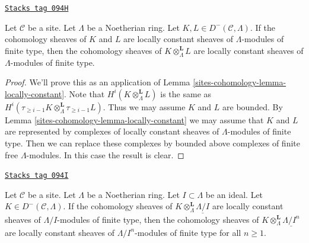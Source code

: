 \begin{lemma}
\label{sites-cohomology-lemma-locally-constant-tensor-product}
\href{https://stacks.math.columbia.edu/tag/094H}{\texttt{Stacks tag 094H}}

Let $\mathcal{C}$ be a site. Let $\Lambda$ be a Noetherian ring.
Let $K, L \in D^-(\mathcal{C}, \Lambda)$. If the cohomology sheaves of
$K$ and $L$ are locally constant sheaves of $\Lambda$-modules of
finite type, then the cohomology sheaves of
$K \otimes_\Lambda^\mathbf{L} L$
are locally constant sheaves of $\Lambda$-modules of finite type.
\end{lemma}

\begin{proof}
We'll prove this as an application of Lemma \ref{sites-cohomology-lemma-locally-constant}.
Note that $H^i(K \otimes_\Lambda^\mathbf{L} L)$ is the same as
$H^i(\tau_{\geq i - 1}K \otimes_\Lambda^\mathbf{L} \tau_{\geq i - 1}L)$.
Thus we may assume $K$ and $L$ are bounded. By
Lemma \ref{sites-cohomology-lemma-locally-constant}
we may assume that $K$ and $L$ are represented by
complexes of locally constant sheaves of $\Lambda$-modules
of finite type. Then we can replace these complexes by
bounded above complexes of finite free $\Lambda$-modules.
In this case the result is clear.
\end{proof}

\begin{lemma}
\label{sites-cohomology-lemma-locally-constant-bounded}
\href{https://stacks.math.columbia.edu/tag/094I}{\texttt{Stacks tag 094I}}

Let $\mathcal{C}$ be a site. Let $\Lambda$ be a Noetherian ring.
Let $I \subset \Lambda$ be an ideal.
Let $K \in D^-(\mathcal{C}, \Lambda)$. If the cohomology sheaves of
$K \otimes_\Lambda^\mathbf{L} \underline{\Lambda/I}$ are locally constant
sheaves of $\Lambda/I$-modules of finite type, then the cohomology sheaves of
$K \otimes_\Lambda^\mathbf{L} \underline{\Lambda/I^n}$
are locally constant sheaves of $\Lambda/I^n$-modules of finite type for all
$n \geq 1$.
\end{lemma}

